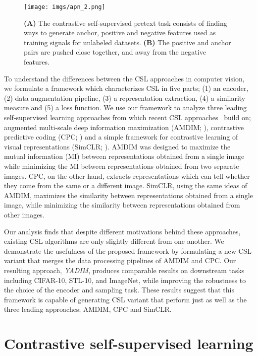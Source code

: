 \documentclass{article}
\begin{document}
\begin{figure}[t]
  \centering
    \texttt{[image: imgs/apn\_2.png]}
    \caption{\textbf{(A)} The contrastive self-supervised pretext task consists of finding ways to generate anchor, positive and negative features used as training signals for unlabeled datasets. \textbf{(B)} The positive and anchor pairs are pushed close together, and away from the negative features.}
    \label{fig:ssl}
\end{figure}

To understand the differences between the CSL approaches in computer vision, we formulate a framework which characterizes CSL in five parts; (1) an encoder, (2) data augmentation pipeline, (3) a representation extraction, (4) a similarity measure and (5) a loss function. We use our framework to analyze three leading self-supervised learning approaches from which recent CSL approaches~\cite{chen2020simple,tian2019contrastive,he2019momentum} build on; augmented multi-scale deep information maximization (AMDIM; \cite{bachman2019learning,hjelm2018learning}), contrastive predictive coding (CPC; \cite{henaff2019data,oord2018representation}) and a simple framework for contrastive learning of visual representations (SimCLR; \cite{chen2020simple}). AMDIM was designed to maximize the mutual information (MI) between representations obtained from a single image while minimizing the MI between representations obtained from two separate images. CPC, on the other hand, extracts representations which can tell whether they come from the same or a different image. SimCLR, using the same ideas of AMDIM, maximizes the similarity between representations obtained from a single image, while minimizing the similarity between representations obtained from other images. 

Our analysis finds that despite different motivations behind these approaches, existing CSL algorithms are only slightly different from one another. We demonstrate the usefulness of the proposed framework by formulating a new CSL variant that merges the data processing pipelines of AMDIM and CPC. Our resulting approach, \textit{YADIM}, produces comparable results on downstream tasks including CIFAR-10, STL-10, and ImageNet, while improving the robustness to the choice of the encoder and sampling task. These results suggest that this framework is capable of generating CSL variant that perform just as well as the three leading approaches; AMDIM, CPC and SimCLR.

\section{Contrastive self-supervised learning}
\end{document}
